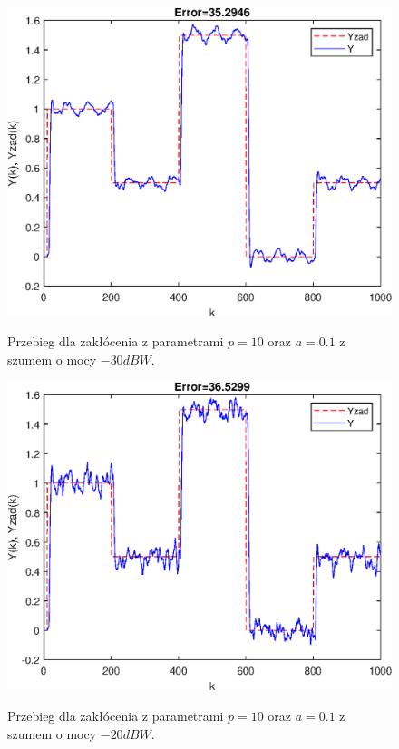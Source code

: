 \begin{figure}[h!]
	\centering
	\includegraphics[scale=1]{Rys/szum-30}
	\label{fig:szum-30}
	\caption{Przebieg dla zakłócenia z parametrami $p=10$ oraz $a=0.1$ z szumem o mocy $-30 dBW$.}
\end{figure}
\begin{figure}[h!]
	\centering
	\includegraphics[scale=1]{Rys/szum-20}
	\label{fig:szum-20}
	\caption{Przebieg dla zakłócenia z parametrami $p=10$ oraz $a=0.1$ z szumem o mocy $-20 dBW$.}
\end{figure}
